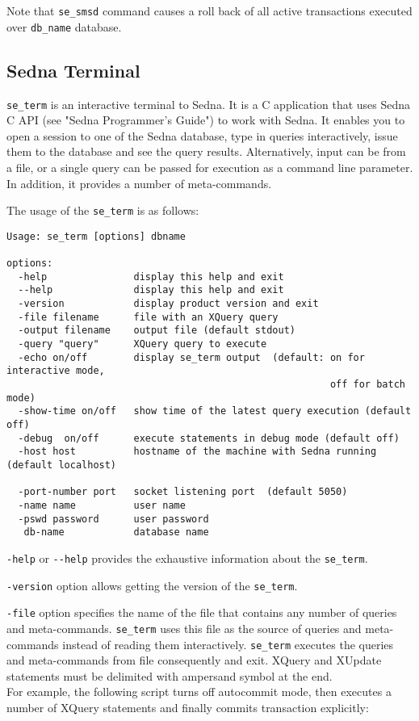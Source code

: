 \documentclass[a4paper,12pt]{article}
\begin{document}
Note that \verb!se_smsd! command causes a roll back of all active transactions executed over \verb!db_name! database.


\subsection{Sedna Terminal}
\label{terminal}
\verb!se_term! is an interactive terminal to Sedna. It is a C application that uses Sedna C API (see "Sedna Programmer's Guide") to work with Sedna. It enables you to open a session to one of the Sedna database, type in queries interactively, issue them to the database and see the query results. Alternatively, input can be from a file, or a single query can be passed for execution as a command line parameter.
In addition, it provides a number of meta-commands.

The usage of the \verb!se_term! is as follows:

\begin{verbatim}
Usage: se_term [options] dbname

options:
  -help			      display this help and exit
  --help		      display this help and exit
  -version		      display product version and exit
  -file filename	  file with an XQuery query
  -output filename	  output file (default stdout)
  -query "query"	  XQuery query to execute
  -echo on/off		  display se_term output  (default: on for interactive mode,
                                                        off for batch mode)
  -show-time on/off	  show time of the latest query execution (default off)
  -debug  on/off      execute statements in debug mode (default off)
  -host host		  hostname of the machine with Sedna running (default localhost)

  -port-number port	  socket listening port  (default 5050)
  -name name		  user name
  -pswd password	  user password
   db-name		      database name
\end{verbatim}

\verb!-help! or \verb!--help! provides the exhaustive information about the \verb!se_term!.

\verb!-version! option allows getting the version of the \verb!se_term!.

\verb!-file! option specifies the name of the file that contains any number of queries and meta-commands. \verb!se_term! uses this file as the source of queries and meta-commands instead of reading 
them interactively. \verb!se_term! executes the queries and meta-commands from file consequently and exit. XQuery and XUpdate statements must be delimited with ampersand symbol at the end. 
\\ For example, the following script turns off autocommit mode, then executes a number of XQuery statements and finally commits transaction explicitly:
\end{document}
